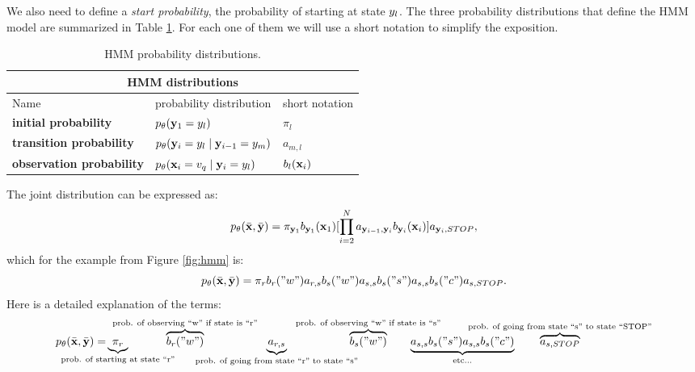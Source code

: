 We also need to define a \emph{start probability}, the probability of starting 
at state ${y}_l$.
 The three probability
distributions that define the HMM model are summarized in Table
\ref{tab:hmm-dist}. 
For each one
of them we will use a short notation to simplify the exposition.
\begin{table}[h]
\begin{center}
\begin{tabular}{|l|l|l|}
\hline
\multicolumn{3}{|c|}{HMM distributions}\\
\hline
Name & probability distribution & short notation \\
\hline
\textbf{initial probability} & $p_{\theta} (\mathbf{y}_1 = {y}_l)$ & $\pi_{l}$\\
\hline
\textbf{transition probability} & $p_{\theta} (\mathbf{y}_i = {y}_l \mid
\mathbf{y}_{i-1} = {y}_m)$ & $a_{m,l}$\\
\hline
\textbf{observation probability} & $p_{\theta}(\mathbf{x}_i = {v}_q\mid \mathbf{y}_i = {y}_l)$ & $b_l(\mathbf{x}_i) $ \\
\hline
\end{tabular}
\end{center}
\caption[HMM probability distributions]{\label{tab:hmm-dist} HMM probability distributions.}
\end{table}

The joint distribution can be expressed as:
\begin{equation}
  p_{\theta}(\bar{\mathbf{x}} ,\bar{\mathbf{y}}) =\pi_{\mathbf{y}_1}b_{\mathbf{y}_1}(\mathbf{x}_1) [\prod_{i=2}^{N}
  a_{\mathbf{y}_{i-1},\mathbf{y}_{i}} b_{\mathbf{y}_{i}}(\mathbf{x}_i)] a_{\mathbf{y}_{i},STOP},
  \label{eqn:hmm}
\end{equation}
which for the example from Figure \ref{fig:hmm} is:
\begin{equation}
  p_{\theta}(\bar{\mathbf{x}} ,\bar{\mathbf{y}}) =\pi_{r} b_r("w") a_{r,s}b_s("w") a_{s,s}b_s("s") a_{s,s}b_s("c")a_{s,STOP}.
  \label{eqn:hmm_ex}
\end{equation}
%
Here is a detailed explanation of the terms:
\begin{equation}
  \joint = \hspace{-1.5cm}\underbrace{\pi_{r}}_{\text{prob. of starting at state ``r''}} \hspace{-2cm}\overbrace{b_r("w")}^{\text{prob. of observing ``w'' if state is ``r''}} \hspace{-2cm}\underbrace{a_{r,s}}_{\text{prob. of going from state ``r'' to state ``s''}} \hspace{-2cm}\overbrace{b_s("w")}^{\text{prob. of observing ``w'' if state is ``s''}} \hspace{-1cm}\underbrace{a_{s,s}b_s("s") a_{s,s}b_s("c")}_{\text{etc...}} \hspace{-1.5cm}\overbrace{a_{s,STOP}}^{\text{prob. of going from state ``s'' to state ``STOP''}}
  \label{eqn:hmm_ex}
\end{equation}

